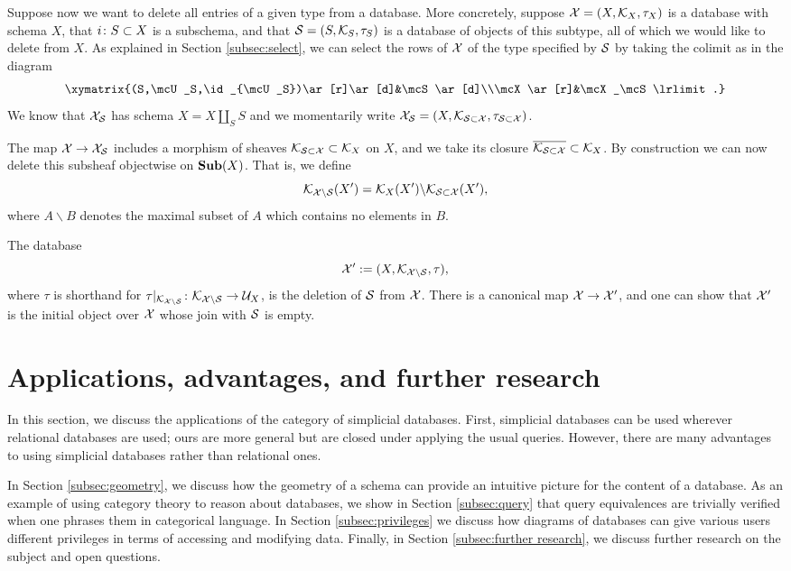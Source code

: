 \documentclass{amsart}
\def\Sub{{\bf Sub}}
\begin{document}
Suppose now we want to delete all entries of a given type from a database.  More concretely, suppose $\mathcal{X}=(X,\mathcal{K}_X,\tau_X)$ is a database with schema $X$, that $i\colon S\subset X$ is a subschema, and that $\mathcal{S}=(S,\mathcal{K}_S,\tau_S)$ is a database of objects of this subtype, all of which we would like to delete from $X$.  As explained in Section \ref{subsec:select}, we can select the rows of $\mathcal{X}$ of the type specified by $\mathcal{S}$ by taking the colimit as in the diagram $$\xymatrix{(S,\mcU_S,\id_{\mcU_S})\ar[r]\ar[d]&\mcS\ar[d]\\\mcX\ar[r]&\mcX_\mcS\lrlimit.}$$  We know that $\mathcal{X}_\mathcal{S}$ has schema $X=X\amalg_SS$ and we momentarily write $\mathcal{X}_\mathcal{S}=(X,\mathcal{K}_{\mathcal{S}\subset\mathcal{X}},\tau_{\mathcal{S}\subset\mathcal{X}})$.  

The map $\mathcal{X}\rightarrow\mathcal{X}_\mathcal{S}$ includes a morphism of sheaves $\mathcal{K}_{\mathcal{S}\subset\mathcal{X}}\subset\mathcal{K}_X$ on $X$, and we take its closure $\overline{\mathcal{K}_{\mathcal{S}\subset\mathcal{X}}}\subset\mathcal{K}_X$.  By construction we can now delete this subsheaf objectwise on $\Sub(X)$.  That is, we define $$\mathcal{K}_{\mathcal{X}\backslash\mathcal{S}}(X')=\mathcal{K}_X(X')\backslash\mathcal{K}_{\mathcal{S}\subset\mathcal{X}}(X'),$$ where $A\backslash B$ denotes the maximal subset of $A$ which contains no elements in $B$.

The database $$\mathcal{X}':=(X,\mathcal{K}_{\mathcal{X}\backslash\mathcal{S}},\tau),$$ where $\tau$ is shorthand for $\tau|_{\mathcal{K}_{\mathcal{X}\backslash\mathcal{S}}}\colon\mathcal{K}_{\mathcal{X}\backslash\mathcal{S}}\rightarrow\mathcal{U}_X$, is the deletion of $\mathcal{S}$ from $\mathcal{X}$.  There is a canonical map $\mathcal{X}\rightarrow\mathcal{X}'$, and one can show that $\mathcal{X}'$ is the initial object over $\mathcal{X}$ whose join with $\mathcal{S}$ is empty.

\section{Applications, advantages, and further research}\label{sec:applications}

In this section, we discuss the applications of the category of simplicial databases.  First, simplicial databases can be used wherever relational databases are used; ours are more general but are closed under applying the usual queries.  However, there are many advantages to using simplicial databases rather than relational ones.  

In Section \ref{subsec:geometry}, we discuss how the geometry of a schema can provide an intuitive picture for the content of a database.  As an example of using category theory to reason about databases, we show in Section \ref{subsec:query} that query equivalences are trivially verified when one phrases them in categorical language.  In Section \ref{subsec:privileges} we discuss how diagrams of databases can give various users different privileges in terms of accessing and modifying data.  Finally, in Section \ref{subsec:further research}, we discuss further research on the subject and open questions.
\end{document}
